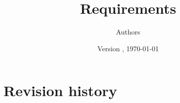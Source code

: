 \documentclass[10pt,a4paper]{article}
\title{\Large Requirements}
\author{Authors}
\date{Version \articleversion, \today}
\begin{document}
\maketitle
\statusbox









\section*{Revision history}
\versiontable
\end{document}
